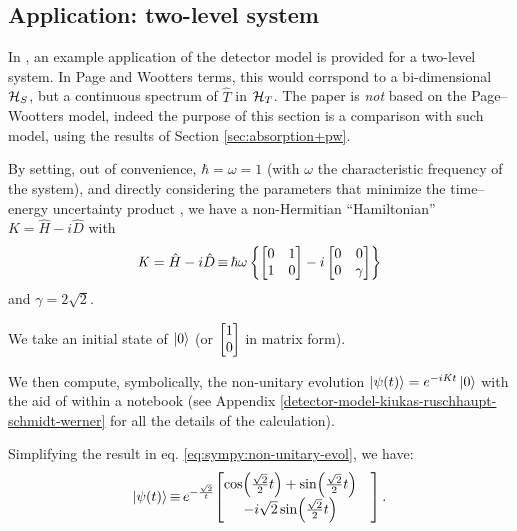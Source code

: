 
\citereset\subsection{Application: two-level system}

In \cite{RuschhauptAbsorption}, an example application of the detector model
is provided for a two-level system.
In Page and Wootters terms,
this would corrspond to a bi-dimensional $\mathcal{H}_S$, but a continuous
spectrum of $\hat{T}$ in $\mathcal{H}_T$. The paper is \emph{not} based on
the Page--Wootters model, indeed the purpose of this section is a comparison
with such model, using the results of Section \ref{sec:absorption+pw}.

By setting, out of convenience, $\hbar = \omega = 1$
(with $\omega$ the characteristic frequency of the system),
and directly considering the parameters
that minimize the time--energy uncertainty product \parencite{RuschhauptAbsorption},
we have a non-Hermitian ``Hamiltonian''
$\mathit{K} = \hat{H} - i\hat{D}$ with
\begin{equation}\label{eq:complexpot}
  \mathit{K} = \hat{H} - i\hat{D} \operatorname*{\equiv}
    \hbar\omega\left\{
      \left[\begin{matrix}0 & 1\\1 & 0\end{matrix}\right] -
      i \left[\begin{matrix}0 & 0\\0 & \gamma \end{matrix}\right]
    \right\}
\end{equation}
and $\gamma = 2\sqrt{2}$.

We take an initial state of $\ket{0}$
(or $\mqty[1\\0]$ in matrix form).

We then compute, symbolically, the non-unitary evolution
$\ket{\psi(t)} = e^{-i\mathit{K}t}\ket{0}$
with the aid of  \parencite{comp:sympy} within a  \parencite{comp:jupyter} notebook
(see Appendix \ref{detector-model-kiukas-ruschhaupt-schmidt-werner} for all the details of the calculation).

Simplifying the result in eq. \eqref{eq:sympy:non-unitary-evol}, we have:
\begin{equation}
  \ket{\psi(t)} \repr e^{-\frac{\sqrt{2}}{t}} \mqty[
    \cos(\frac{\sqrt{2}}{2}t) + \sin(\frac{\sqrt{2}}{2}t)& \\
                     -i\sqrt{2} \sin(\frac{\sqrt{2}}{2}t)&
  ] \,\text{.}
\end{equation}

